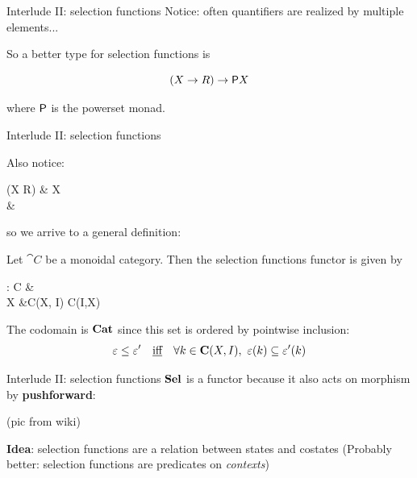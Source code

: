 \begin{frame}{Interlude II: selection functions}
	Notice: often quantifiers are realized by multiple elements...



	So a better type for selection functions is

	\begin{equation*}
		(X \to R) \to \mathsf{P} X
	\end{equation*}

	where $\mathsf{P}$ is the powerset monad.
\end{frame}

\begin{frame}{Interlude II: selection functions}

	Also notice:

	\begin{diagram*}
		(X \to R)  \& \copow  X\\[-8ex]
		 \& 
	\end{diagram*}

	so we arrive to a general definition:

	\begin{definition}
		Let $\cat C$ be a monoidal category. Then the selection functions functor is
		given by
		\begin{eqalign*}
			\Sel : \cat C &\longto \Cat\\
			X &\longmapsto \cat C(X, I) \to \copow \cat C(I,X)
		\end{eqalign*}
	\end{definition}

	The codomain is $\mathbf{Cat}$ since this set is ordered by pointwise inclusion:
	\vspace{-2ex}
	\begin{equation*}
		\varepsilon \leq \varepsilon' \quad\text{\underline{iff}}\quad \forall k \in \mathbf{C}(X,I),\ \varepsilon(k) \subseteq \varepsilon'(k)
	\end{equation*}
\end{frame}

\begin{frame}{Interlude II: selection functions}
	$\mathbf{Sel}$ is a functor because it also acts on morphism by \textbf{pushforward}:

	(pic from wiki)

	\textbf{Idea}: selection functions are a relation between states and costates
	(Probably better: selection functions are predicates on \emph{contexts})
\end{frame}

